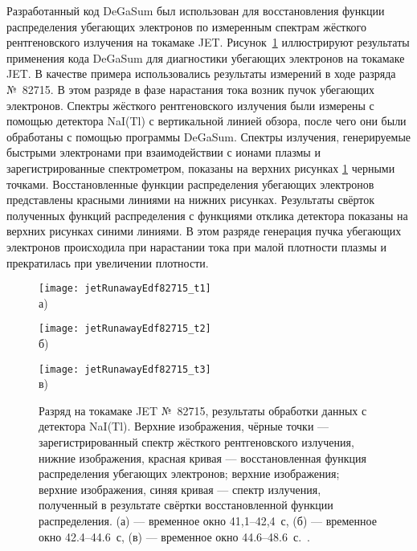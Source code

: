 Разработанный код DeGaSum был использован для восстановления функции распределения убегающих электронов по измеренным спектрам жёсткого рентгеновского излучения на токамаке JET. Рисунок~\ref{fig:jetRunawayEdf82715} иллюстрируют результаты применения кода DeGaSum для диагностики убегающих электронов на токамаке JET. В качестве примера использовались результаты измерений в ходе разряда №~82715. В этом разряде в фазе нарастания тока возник пучок убегающих электронов. Спектры жёсткого рентгеновского излучения были измерены с помощью детектора NaI(Tl) с вертикальной линией обзора, после чего они были обработаны с помощью программы DeGaSum. Спектры излучения, генерируемые быстрыми электронами при взаимодействии с ионами плазмы и зарегистрированные спектрометром, показаны на верхних рисунках \ref{fig:jetRunawayEdf82715} черными точками. Восстановленные функции распределения убегающих электронов представлены красными линиями на нижних рисунках. Результаты свёрток полученных функций распределения с функциями отклика детектора показаны на верхних рисунках синими линиями. В этом разряде генерация пучка убегающих электронов происходила при нарастании тока при малой плотности плазмы и прекратилась при увеличении плотности.~\cite{Shevelev2013} 

\begin{figure}[ht]
    \begin{minipage}[b][][b]{0.42\linewidth}\centering
        \texttt{[image: jetRunawayEdf82715\_t1]} \\ а)
    \end{minipage}
    \hfill
    \begin{minipage}[b][][b]{0.42\linewidth}\centering
        \texttt{[image: jetRunawayEdf82715\_t2]} \\ б)
    \end{minipage}
    \hfill
    \begin{minipage}[b][][b]{0.42\linewidth}\centering
        \texttt{[image: jetRunawayEdf82715\_t3]} \\ в)
    \end{minipage}
    \caption{ Разряд на токамаке JET №~82715, результаты обработки данных с детектора NaI(Tl). Верхние изображения, чёрные точки --- зарегистрированный спектр жёсткого рентгеновского излучения, нижние изображения, красная кривая --- восстановленная функция распределения убегающих электронов; верхние изображения; верхние изображения, синяя кривая --- спектр излучения, полученный в результате свёртки восстановленной функции распределения. (а) --- временное окно 41,1--42,4~с, (б) --- временное окно 42.4--44.6~с, (в) --- временное окно 44.6--48.6~с.~\cite{Shevelev2013}. }
    \label{fig:jetRunawayEdf82715}
\end{figure}


